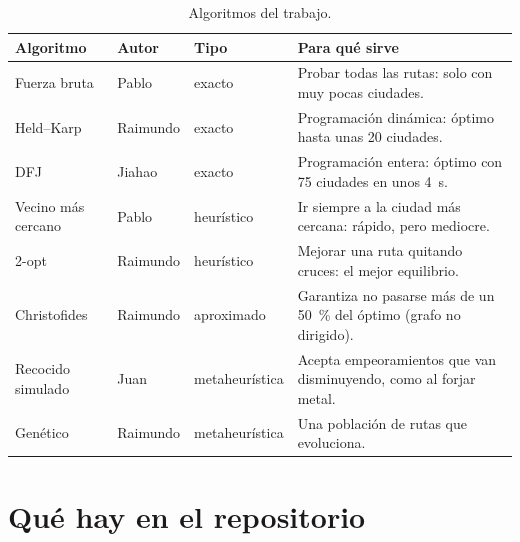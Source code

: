 \documentclass[11pt,a4paper,twoside,openany]{report}
\begin{document}
\begin{table}[htbp]
  \centering
  \caption{Algoritmos del trabajo.}
  \small
  \begin{tabularx}{\linewidth}{@{}l l l X@{}}
    \toprule
    Algoritmo & Autor & Tipo & Para qué sirve \\
    \midrule
    Fuerza bruta & Pablo & exacto & Probar todas las rutas: solo con muy pocas ciudades. \\
    Held--Karp & Raimundo & exacto & Programación dinámica: óptimo hasta unas 20 ciudades. \\
    DFJ & Jiahao & exacto & Programación entera: óptimo con 75 ciudades en unos 4~s. \\
    Vecino más cercano & Pablo & heurístico & Ir siempre a la ciudad más cercana: rápido, pero mediocre. \\
    2-opt & Raimundo & heurístico & Mejorar una ruta quitando cruces: el mejor equilibrio. \\
    Christofides & Raimundo & aproximado & Garantiza no pasarse más de un 50~\% del óptimo (grafo no dirigido). \\
    Recocido simulado & Juan & metaheurística & Acepta empeoramientos que van disminuyendo, como al forjar metal. \\
    Genético & Raimundo & metaheurística & Una población de rutas que evoluciona. \\
    \bottomrule
  \end{tabularx}
\end{table}

\section{Qué hay en el repositorio}
\end{document}
